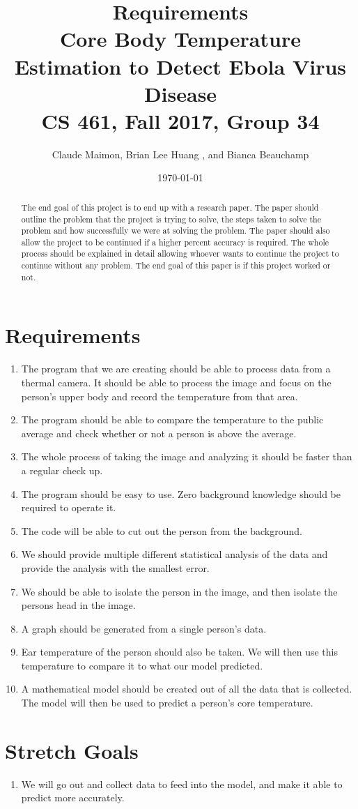 \documentclass{article}
\title{%
  Requirements \\
  \vspace{0.4cm}
  \large Core Body Temperature Estimation to Detect Ebola Virus Disease \\
  \vspace{0.4cm}
  \large CS 461, Fall 2017, Group 34\\
    }
\author{Claude Maimon,  Brian Lee Huang , and Bianca Beauchamp}
\date{\today}
\begin{document}
\maketitle


\begin{abstract}
	The end goal of this project is to end up with a research paper. The paper should outline the problem that the project is trying to solve, the steps taken to solve the problem and how successfully we were
	at solving the problem. The paper should also allow the project to be continued if a higher percent accuracy is required. The whole process should be explained in detail allowing whoever wants to continue the
	project to continue without any problem. The end goal of this paper is if this project worked or not.
\end{abstract}

\newpage
\section{Requirements}
	\begin{enumerate}
		\item The program that we are creating should be able to process data from a thermal camera. It should be able to process the image and focus on the person's upper body and record the temperature from that area.
		\item The program should be able to compare the temperature to the public average and check whether or not a person is above the average.
		\item The whole process of taking the image and analyzing it should be faster than a regular check up.
		\item The program should be easy to use. Zero background knowledge should be required to operate it.
		\item The code will be able to cut out the person from the background.
		\item We should provide multiple different statistical analysis of the data and provide the analysis with the smallest error.
		\item We should be able to isolate the person in the image, and then isolate the persons head in the image.
		\item A graph should be generated from a single person's data.
		\item Ear temperature of the person should also be taken. We will then use this temperature to compare it to what our model predicted.
		\item A mathematical model should be created out of all the data that is collected. The model will then be used to predict a person's core temperature.
	\end{enumerate}
\section{Stretch Goals}
	\begin{enumerate}
		\item We will go out and collect data to feed into the model, and make it able to predict more accurately.
	\end{enumerate}
\end{document}
